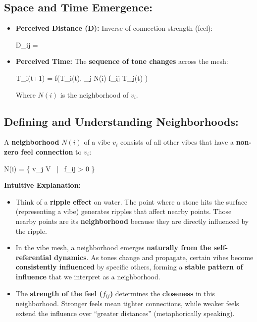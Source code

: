 \documentclass{article}
\let\oldequation\equation
\let\endoldequation\endequation
\renewenvironment{equation}{%
    \noindent\vspace{-\parskip}\vspace{-\baselineskip}%
    \oldequation
}{%
    \endoldequation
    \noindent\vspace{-\parskip}\vspace{-\baselineskip}%
}
\theoremstyle{definition}
\theoremstyle{axiom}
\theoremstyle{theorem}
\theoremstyle{proposition}
\begin{document}
\subsection{Space and Time Emergence:}

\begin{itemize}
\item \textbf{Perceived Distance (D):} Inverse of connection strength (feel):

\begin{equation}
D_{ij} = 
\end{equation}

\item \textbf{Perceived Time:} The \textbf{sequence of tone changes} across the mesh:

\begin{equation}
T_i(t+1) = f\left(T_i(t), \sum_{j \in N(i)} f_{ij} \cdot T_j(t) \right)
\end{equation}

Where $N(i)$ is the neighborhood of $v_i$.
\end{itemize}

\subsection{Defining and Understanding Neighborhoods:}

A \textbf{neighborhood} $N(i)$ of a vibe $v_i$ consists of all other vibes that have a \textbf{non-zero feel connection} to $v_i$:

\begin{equation}
N(i) = \{ v_j \in V \ | \ f_{ij} > 0 \}
\end{equation}

\textbf{Intuitive Explanation:}

\begin{itemize}
\item Think of a \textbf{ripple effect} on water. The point where a stone hits the surface (representing a vibe) generates ripples that affect nearby points. Those nearby points are its \textbf{neighborhood} because they are directly influenced by the ripple.
\item In the vibe mesh, a neighborhood emerges \textbf{naturally from the self-referential dynamics}. As tones change and propagate, certain vibes become \textbf{consistently influenced} by specific others, forming a \textbf{stable pattern of influence} that we interpret as a neighborhood.
\item The \textbf{strength of the feel ($f_{ij}$)} determines the \textbf{closeness} in this neighborhood. Stronger feels mean tighter connections, while weaker feels extend the influence over \enquote{greater distances} (metaphorically speaking).
\end{itemize}
\end{document}
